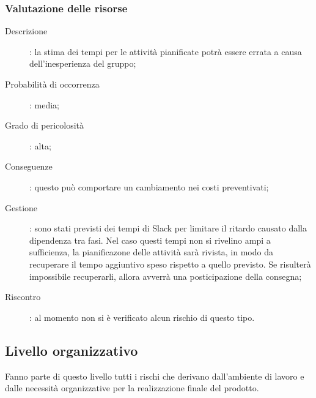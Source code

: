 \documentclass[../PianoDiProgetto.tex]{subfiles}
\begin{document}
		\subsubsection{Valutazione delle risorse} 
		\begin{description} 
			\item [Descrizione]: la stima dei tempi per le attività pianificate potrà essere errata a causa dell'inesperienza del gruppo;
			\item [Probabilità di occorrenza]: media;
			\item [Grado di pericolosità]: alta;
			\item [Conseguenze]: questo può comportare un cambiamento nei costi preventivati;
			\item [Gestione]: sono stati previsti dei tempi di Slack per limitare il ritardo causato dalla dipendenza tra fasi. Nel caso questi tempi non si rivelino ampi a sufficienza, la pianificazone delle attività sarà rivista, in modo da recuperare il tempo aggiuntivo speso rispetto a quello previsto. Se risulterà impossibile recuperarli, allora avverrà una posticipazione della consegna;
			\item [Riscontro]: al momento non si è verificato alcun rischio di questo tipo.
		\end{description}
		  
	\subsection{Livello organizzativo}
	Fanno parte di questo livello tutti i rischi che derivano dall'ambiente di lavoro e dalle necessità organizzative per la realizzazione finale del prodotto.
\end{document}

